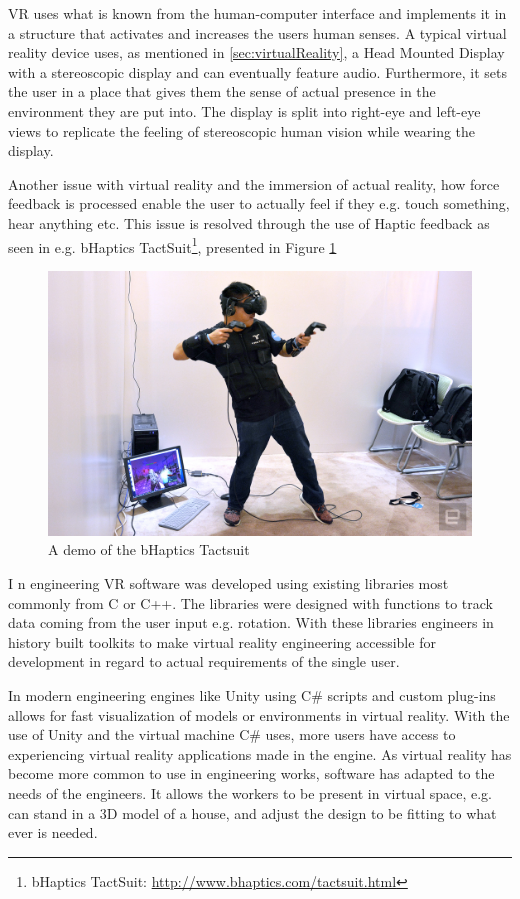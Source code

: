 	VR uses what is known from the human-computer interface and implements it in a structure that activates and increases the users human senses. A typical virtual reality device uses, as mentioned in \autoref{sec:virtualReality}, a Head Mounted Display with a stereoscopic display and can eventually feature audio. Furthermore, it sets the user in a place that gives them the sense of actual presence in the environment they are put into. The display is split into right-eye and left-eye views to replicate the feeling of stereoscopic human vision while wearing the display. 
	
	Another issue with virtual reality and the immersion of actual reality, how force feedback is processed enable the user to actually feel if they e.g. touch something, hear anything etc. This issue is resolved through the use of Haptic feedback as seen in e.g. bHaptics TactSuit\footnote{bHaptics TactSuit: \url{http://www.bhaptics.com/tactsuit.html}}, presented in Figure \ref{fig:haptics} \\
	\begin{figure}[H]
	\centering
	\includegraphics[width=0.6\linewidth]{figure/Analysis/haptics}
	\caption{A demo of the bHaptics Tactsuit}
	\label{fig:haptics}
	\end{figure}
	I
	n engineering VR software was developed using existing libraries most commonly from C or C++. The libraries were designed with functions to track data coming from the user input e.g. rotation. With these libraries engineers in history built toolkits to make virtual reality engineering accessible for development in regard to actual requirements of the single user. \cite{engineeringVR}
	
	In modern engineering engines like Unity using C\# scripts and custom plug-ins allows for fast visualization of models or environments in virtual reality. With the use of Unity and the virtual machine C\# uses, more users have access to experiencing virtual reality applications made in the engine. As virtual reality has become more common to use in engineering works, software has adapted to the needs of the engineers. It allows the workers to be present in virtual space, e.g. can stand in a 3D model of a house, and adjust the design to be fitting to what ever is needed.
	
